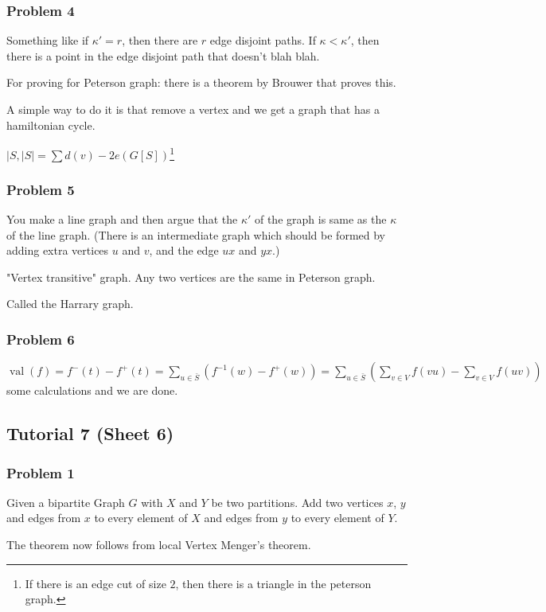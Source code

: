 \documentclass[11pt]{article}
\def\val{\operatorname{val}}
\begin{document}
\subsubsection{Problem 4}
\label{sec:org9352206}
Something like if \(\kappa' = r\), then there are \(r\) edge disjoint paths. If
\(\kappa < \kappa'\), then there is a point in the edge disjoint path that
doesn't blah blah.

For proving for Peterson graph: there is a theorem by Brouwer that proves
this.

A simple way to do it is that remove a vertex and we get a graph that has a
hamiltonian cycle.

\(\vert S, \vert{S} \vert = \sum d(v) - 2e(G[S])\)\footnote{If there is an edge cut of size \(2\), then there is a triangle in the
peterson graph.}
\subsubsection{Problem 5}
\label{sec:org0ca4246}
You make a line graph and then argue that the \(\kappa'\) of the graph is same
as the \(\kappa\) of the line graph. (There is an intermediate graph which
should be formed by adding extra vertices \(u\) and \(v\), and the edge \(ux\) and
\(yx\).)

"Vertex transitive" graph. Any two vertices are the same in Peterson graph.

Called the Harrary graph.
\subsubsection{Problem 6}
\label{sec:org56b45b2}
\(\val(f) = f^-(t) - f^{+}(t) = \sum_{u \in \bar{S}} (f^{-1}(w) - f^{+}(w)) =
    \sum_{u\in \bar{S}}(\sum_{v \in V} f(vu) - \sum_{v \in V} f(uv))\) some
calculations and we are done.
\subsection{Tutorial 7 (Sheet 6)}
\label{sec:org173883b}
\subsubsection{Problem 1}
\label{sec:org48f5b86}
Given a bipartite Graph \(G\) with \(X\) and \(Y\) be two partitions. Add two
vertices \(x\), \(y\) and edges from \(x\) to every element of \(X\) and edges from
\(y\) to every element of \(Y\).

The theorem now follows from local Vertex Menger's theorem.
\end{document}
